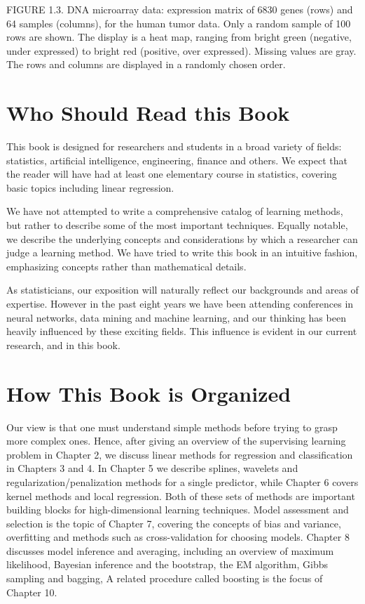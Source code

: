 \documentclass[10pt]{article}
\begin{document}
FIGURE 1.3. DNA microarray data: expression matrix of 6830 genes (rows) and 64 samples (columns), for the human tumor data. Only a random sample of 100 rows are shown. The display is a heat map, ranging from bright green (negative, under expressed) to bright red (positive, over expressed). Missing values are gray. The rows and columns are displayed in a randomly chosen order.

\section*{Who Should Read this Book}
This book is designed for researchers and students in a broad variety of fields: statistics, artificial intelligence, engineering, finance and others. We expect that the reader will have had at least one elementary course in statistics, covering basic topics including linear regression.

We have not attempted to write a comprehensive catalog of learning methods, but rather to describe some of the most important techniques. Equally notable, we describe the underlying concepts and considerations by which a researcher can judge a learning method. We have tried to write this book in an intuitive fashion, emphasizing concepts rather than mathematical details.

As statisticians, our exposition will naturally reflect our backgrounds and areas of expertise. However in the past eight years we have been attending conferences in neural networks, data mining and machine learning, and our thinking has been heavily influenced by these exciting fields. This influence is evident in our current research, and in this book.

\section*{How This Book is Organized}
Our view is that one must understand simple methods before trying to grasp more complex ones. Hence, after giving an overview of the supervising learning problem in Chapter 2, we discuss linear methods for regression and classification in Chapters 3 and 4. In Chapter 5 we describe splines, wavelets and regularization/penalization methods for a single predictor, while Chapter 6 covers kernel methods and local regression. Both of these sets of methods are important building blocks for high-dimensional learning techniques. Model assessment and selection is the topic of Chapter 7, covering the concepts of bias and variance, overfitting and methods such as cross-validation for choosing models. Chapter 8 discusses model inference and averaging, including an overview of maximum likelihood, Bayesian inference and the bootstrap, the EM algorithm, Gibbs sampling and bagging, A related procedure called boosting is the focus of Chapter 10.
\end{document}
